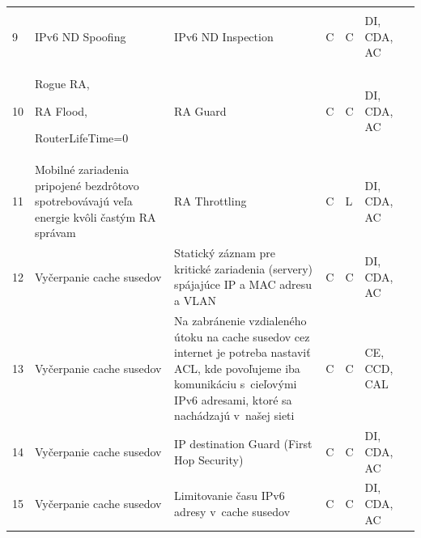 \begin{longtable}[!htbp]{|C{2.5em}L{11em}L{11em}C{2.5em}C{4em}C{5em}L{2.5em}|}
	\cite{zXCpMaLbN1J7D1z2}\\
	 9	&IPv6 ND Spoofing	&IPv6 ND Inspection	&C	&C	&DI,
	CDA,
	AC	&\cite{Podermanski1222015}
	
	\cite{Gregr522015}
	
	\cite{zXCpMaLbN1J7D1z2}\\
	10	&Rogue RA,
	
	RA Flood,
	
	RouterLifeTime=0
	&RA Guard	&C	&C	&DI,
	CDA,
	AC	&\cite{Podermanski1222015}
	
	\cite{Gregr522015}
	
	\cite{zXCpMaLbN1J7D1z2}\\
	 11	&Mobilné zariadenia pripojené bezdrôtovo spotrebovávajú veľa energie kvôli častým RA správam	&RA Throttling	&C	&L	&DI,
	CDA,
	AC	& \cite{Podermanski532015}
	
	\cite{o31nYG4kn98wWNRS}\\
	12	&Vyčerpanie cache susedov	&Statický záznam pre kritické zariadenia (servery) spájajúce IP a MAC adresu a VLAN
	&C	&C	&DI,
	CDA,
	AC	&\cite{Podermanski1232015}
	
	\cite{Podermanski1932015}
	\\
	 13	&Vyčerpanie cache susedov	&Na zabránenie vzdialeného útoku na cache susedov cez internet je potreba nastaviť ACL, kde povoľujeme iba komunikáciu s~cieľovými IPv6 adresami, ktoré sa nachádzajú v~našej sieti	&C	&C	&CE,
	CCD,
	CAL	&\cite{Podermanski1232015}
	
	\cite{Podermanski1932015}
	\\
	14	&Vyčerpanie cache susedov	&IP destination Guard (First Hop Security)
	
	
	&C	&C	&DI,
	CDA,
	AC	&\cite{Podermanski1232015}
	
	\cite{Podermanski1932015}
	\\
	 15	&Vyčerpanie cache susedov	&Limitovanie času IPv6 adresy v~cache susedov	&C	&C	&DI,
	CDA,
	AC	&\cite{Podermanski1232015}
	
	\cite{Podermanski1932015}\\ 
	\hline
\end{longtable}%


